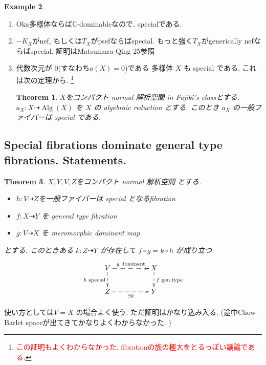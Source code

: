 \documentclass[dvipdfmx,a4paper,11pt]{article} %
\newtheorem{thm}{Theorem}[section]
\theoremstyle{definition}
\newtheorem{ex}[thm]{Example}
\theoremstyle{remark}
\numberwithin{equation}{section}
\newcommand{\C}{\mathbb{C}}
\newcommand{\xr}[1]{\textcolor{red}{#1}}
\begin{document}
\begin{ex}
\begin{enumerate}
\item[6'.] Oka多様体ならば$\C$-dominableなので, specialである. 
 \item[7.] $-K_X$がnef, もしくは$T_X$がpsefならばspecial. もっと強く$T_X$がgenerically nefならばspecial. 
 証明はMatsumura-Qing 25参照
\item[8.] 代数次元が \(0\)(すなわち\(a(X)=0\))である 多様体 \(X\) も special である. 
これは次の定理から. \footnote{\xr{この証明もよくわからなかった. fibrationの族の極大をとるっぽい議論である.}}
\begin{thm}\cite[Theorem 2.4]{Cam04}
$X$をコンパクト normal 解析空間 in Fujiki's classとする. 
\(a_X : X \dashrightarrow \operatorname{Alg}(X)\) を \(X\) の algebraic reduction とする.
このとき \(a_X\) の一般ファイバーは special である.
\end{thm}

\end{enumerate}

\end{ex}


\subsection{Special fibrations dominate general type fibrations. Statements. \cite[2.2]{Cam04}}


\begin{thm}\cite[Theorem 2.6]{Cam04}
\label{thm-Cam04-2.6}
$X, Y, V, Z$をコンパクト normal 解析空間 とする. 
\begin{itemize}
\item \(h : V \dashrightarrow Z\)を一般ファイバーは special となるfibration 
\item  \(f : X \dashrightarrow Y\) を general type fibration
\item \(g : V \dashrightarrow X\) を meromorphic dominant map
\end{itemize}
とする. このときある \(k : Z \dashrightarrow Y\) が存在して
\(
f \circ g = k \circ h
\)
が成り立つ.
\[
\xymatrix@C=50pt@R=20pt{
V \ar@{-->}[r]^{g \text{ dominant}} \ar@{-->}[d]_{h \text{ special}} & X \ar@{-->}[d]^{f \text{ gen.type}} \\
Z \ar@{-->}[r]_{\exists k} & Y
}
\]
\end{thm}
 使い方としては\(V=X\) の場合よく使う. ただ証明はかなり込み入る. (途中Chow-Barlet spaceが出てきてかなりよくわからなかった. )
 
\end{document}
